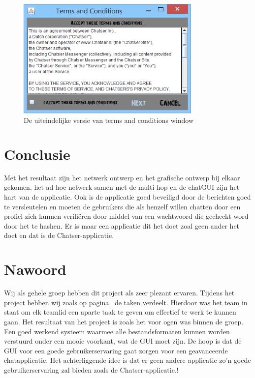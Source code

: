 \documentclass[12pt]{article}
\begin{document}
\begin{figure}[!h]
\begin{center}
\includegraphics[width = 90mm]{Terms_Conditions1}
\caption{De uiteindelijke versie van terms and conditions window}
\label{figure016}
\end{center}
\end{figure}

\newpage

\section{Conclusie}
Met het resultaat zijn het netwerk ontwerp en het grafische ontwerp bij elkaar gekomen.  het ad-hoc netwerk samen met de multi-hop en de chatGUI zijn het hart van de applicatie.  Ook is de applicatie goed beveiligd door de berichten goed te versleutelen en moeten de gebruikers die als henzelf willen chatten door een profiel zich kunnen verifi\"eren door middel van een wachtwoord die gecheckt word door het te hashen. Er is maar een applicatie dit het doet zoal geen ander het doet en dat is de Chatser-applicatie\small\textcopyright.

\newpage

\section{Nawoord}
Wij als gehele groep hebben dit project als zeer plezant ervaren. Tijdens het project hebben wij zoals op pagina~\pageref{taken} de taken verdeelt. Hierdoor was het team in staat om elk teamlid een aparte taak te geven om effectief te werk te kunnen gaan. Het resultaat van het project is zoals het voor ogen was binnen de groep. Een goed werkend systeem waarmee alle bestandsformaten kunnen  worden verstuurd onder een mooie voorkant, wat de GUI moet zijn. De hoop is dat de GUI voor een goede gebruikerservaring gaat zorgen voor een geavanceerde chatapplicatie. Het achterliggende idee is dat er geen andere applicatie zo'n goede gebruikerservaring zal bieden zoals de Chatser-applicatie\small.\textcopyright!

\newpage



\end{document}
